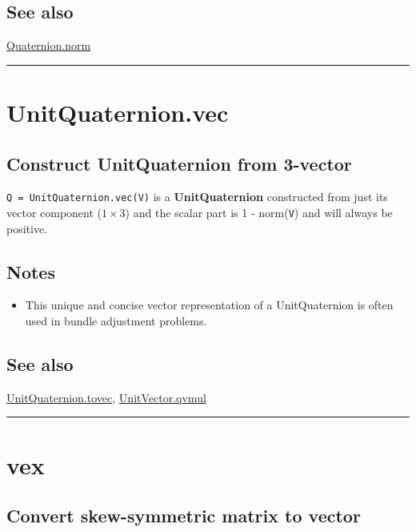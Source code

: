 \subsection*{See also}


\hyperlink{Quaternion.norm}{\color{blue} Quaternion.norm}

\vspace{1.5ex}\hrule

\hypertarget{UnitQuaternion.vec}{\section*{UnitQuaternion.vec}}
\subsection*{Construct UnitQuaternion from 3-vector}


\texttt{Q = UnitQuaternion.vec(V)} is a \textbf{\color{red} UnitQuaternion} constructed from just its vector
component ($1 \times 3$) and the scalar part is 1 - norm(\texttt{V}) and will always be positive.


\subsection*{Notes}
\begin{itemize}
  \item This unique and concise vector representation of a UnitQuaternion is often used    in bundle adjustment problems.
\end{itemize}

\subsection*{See also}


\hyperlink{UnitQuaternion.tovec}{\color{blue} UnitQuaternion.tovec}, \hyperlink{UnitVector.qvmul}{\color{blue} UnitVector.qvmul}

\vspace{1.5ex}\rule{\textwidth}{1mm}

\hypertarget{vex}{\section*{vex}}
\subsection*{Convert skew-symmetric matrix to vector}


